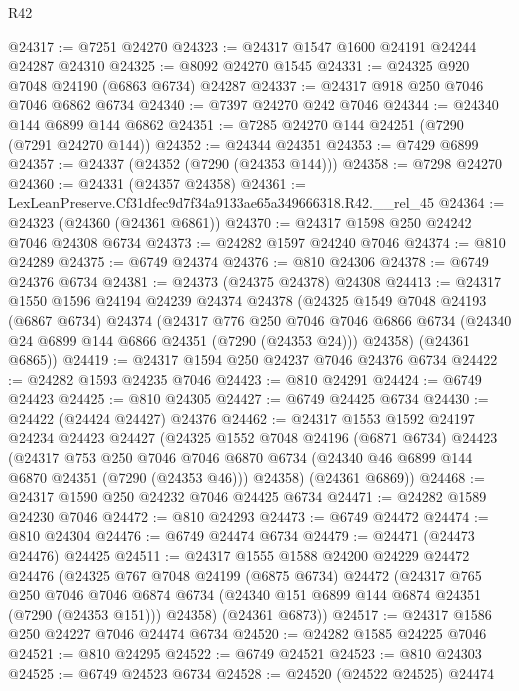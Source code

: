 \begin{lexlean}{R42}
\begin{coremodule}
{@24317 := @7251 @24270
@24323 := @24317 @1547 @1600 @24191 @24244 @24287 @24310
@24325 := @8092 @24270 @1545
@24331 := @24325 @920 @7048 @24190 (@6863 @6734) @24287
@24337 := @24317 @918 @250 @7046 @7046 @6862 @6734
@24340 := @7397 @24270 @242 @7046
@24344 := @24340 @144 @6899 @144 @6862
@24351 := @7285 @24270 @144 @24251 (@7290 (@7291 @24270 @144))
@24352 := @24344 @24351
@24353 := @7429 @6899
@24357 := @24337 (@24352 (@7290 (@24353 @144)))
@24358 := @7298 @24270
@24360 := @24331 (@24357 @24358)
@24361 := LexLeanPreserve.Cf31dfec9d7f34a9133ae65a349666318.R42.__rel_45
@24364 := @24323 (@24360 (@24361 @6861))
@24370 := @24317 @1598 @250 @24242 @7046 @24308 @6734
@24373 := @24282 @1597 @24240 @7046
@24374 := @810 @24289
@24375 := @6749 @24374
@24376 := @810 @24306
@24378 := @6749 @24376 @6734
@24381 := @24373 (@24375 @24378) @24308
@24413 := @24317
    @1550
    @1596
    @24194
    @24239
    @24374
    @24378
    (@24325
      @1549
      @7048
      @24193
      (@6867 @6734)
      @24374
      (@24317
        @776
        @250
        @7046
        @7046
        @6866
        @6734
        (@24340 @24 @6899 @144 @6866 @24351 (@7290 (@24353 @24)))
        @24358)
      (@24361 @6865))
@24419 := @24317 @1594 @250 @24237 @7046 @24376 @6734
@24422 := @24282 @1593 @24235 @7046
@24423 := @810 @24291
@24424 := @6749 @24423
@24425 := @810 @24305
@24427 := @6749 @24425 @6734
@24430 := @24422 (@24424 @24427) @24376
@24462 := @24317
    @1553
    @1592
    @24197
    @24234
    @24423
    @24427
    (@24325
      @1552
      @7048
      @24196
      (@6871 @6734)
      @24423
      (@24317
        @753
        @250
        @7046
        @7046
        @6870
        @6734
        (@24340 @46 @6899 @144 @6870 @24351 (@7290 (@24353 @46)))
        @24358)
      (@24361 @6869))
@24468 := @24317 @1590 @250 @24232 @7046 @24425 @6734
@24471 := @24282 @1589 @24230 @7046
@24472 := @810 @24293
@24473 := @6749 @24472
@24474 := @810 @24304
@24476 := @6749 @24474 @6734
@24479 := @24471 (@24473 @24476) @24425
@24511 := @24317
    @1555
    @1588
    @24200
    @24229
    @24472
    @24476
    (@24325
      @767
      @7048
      @24199
      (@6875 @6734)
      @24472
      (@24317
        @765
        @250
        @7046
        @7046
        @6874
        @6734
        (@24340 @151 @6899 @144 @6874 @24351 (@7290 (@24353 @151)))
        @24358)
      (@24361 @6873))
@24517 := @24317 @1586 @250 @24227 @7046 @24474 @6734
@24520 := @24282 @1585 @24225 @7046
@24521 := @810 @24295
@24522 := @6749 @24521
@24523 := @810 @24303
@24525 := @6749 @24523 @6734
@24528 := @24520 (@24522 @24525) @24474
}
\end{coremodule}
\end{lexlean}
